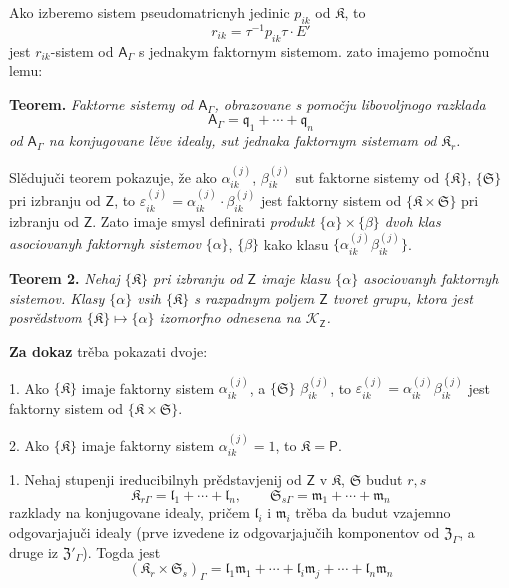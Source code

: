 \documentclass[11pt]{article}
\begin{document}
Ako izberemo sistem pseudomatricnyh jedinic \(p_{ik}\) od \(\mathfrak K\), to
\[
r_{ik}=\tau^{-1}p_{ik}\tau\cdot E'
\]
jest \(r_{ik}\)-sistem od \(\mathsf{A}_\Gamma\) s jednakym faktornym sistemom. zato imajemo pomočnu lemu:

\textbf{Teorem.} \emph{Faktorne sistemy od \(\mathsf{A}_\Gamma\), obrazovane s pomočju libovoljnogo razklada}
\[
\mathsf{A}_\Gamma=\mathfrak q_1+\cdots+\mathfrak q_n
\]
\emph{od \(\mathsf{A}_\Gamma\) na konjugovane lěve idealy, sut jednaka faktornym sistemam od \(\mathfrak K_r\).}

Slědujuči teorem pokazuje, že ako \(\alpha_{ik}^{(j)}\), \(\beta_{ik}^{(j)}\) sut faktorne sistemy od \(\{\mathfrak K\}\), \(\{\mathfrak S\}\) pri izbranju od \(\mathsf{Z}\), to \(\varepsilon_{ik}^{(j)}=\alpha_{ik}^{(j)}\cdot\beta_{ik}^{(j)}\) jest faktorny sistem od \(\{\mathfrak K\times\mathfrak S\}\) pri izbranju od \(\mathsf{Z}\). Zato imaje smysl definirati \emph{produkt \(\{\alpha\}\times\{\beta\}\) dvoh klas asociovanyh faktornyh sistemov} \(\{\alpha\}\), \(\{\beta\}\) kako klasu \(\{\alpha_{ik}^{(j)}\beta_{ik}^{(j)}\}\).

\textbf{Teorem 2.} \emph{Nehaj \(\{\mathfrak K\}\) pri izbranju od \(\mathsf{Z}\) imaje klasu \(\{\alpha\}\) asociovanyh faktornyh sistemov. Klasy \(\{\alpha\}\) vsih \(\{\mathfrak K\}\) s razpadnym poljem \(\mathsf{Z}\) tvoret grupu, ktora jest posrědstvom \(\{\mathfrak K\}\mapsto\{\alpha\}\) izomorfno odnesena na \(\mathscr K_{\mathsf{Z}}\).}

\textbf{Za dokaz} trěba pokazati dvoje:

1. Ako \(\{\mathfrak K\}\) imaje faktorny sistem \(\alpha_{ik}^{(j)}\), a \(\{\mathfrak S\}\) \(\beta_{ik}^{(j)}\), to \(\varepsilon_{ik}^{(j)}=\alpha_{ik}^{(j)}\beta_{ik}^{(j)}\) jest faktorny sistem od \(\{\mathfrak K\times\mathfrak S\}\).

2. Ako \(\{\mathfrak K\}\) imaje faktorny sistem \(\alpha_{ik}^{(j)}=1\), to \(\mathfrak K=\mathsf P\).

1. Nehaj stupenji ireducibilnyh prědstavjenij od \(\mathsf{Z}\) v \(\mathfrak K\), \(\mathfrak S\) budut \(r,s\)
\[
\mathfrak K_{r\Gamma}=\mathfrak l_1+\cdots+\mathfrak l_n,\qquad
\mathfrak S_{s\Gamma}=\mathfrak m_1+\cdots+\mathfrak m_n
\]
razklady na konjugovane idealy, pričem \(\mathfrak l_i\) i \(\mathfrak m_i\) trěba da budut vzajemno odgovarjajuči idealy (prve izvedene iz odgovarjajučih komponentov od \(\mathfrak Z_\Gamma\), a druge iz \(\mathfrak Z'_\Gamma\)). Togda jest
\[
(\mathfrak K_r\times\mathfrak S_s)_\Gamma
=\mathfrak l_1\mathfrak m_1+\cdots+\mathfrak l_i\mathfrak m_j+\cdots+\mathfrak l_n\mathfrak m_n
\]
\end{document}
